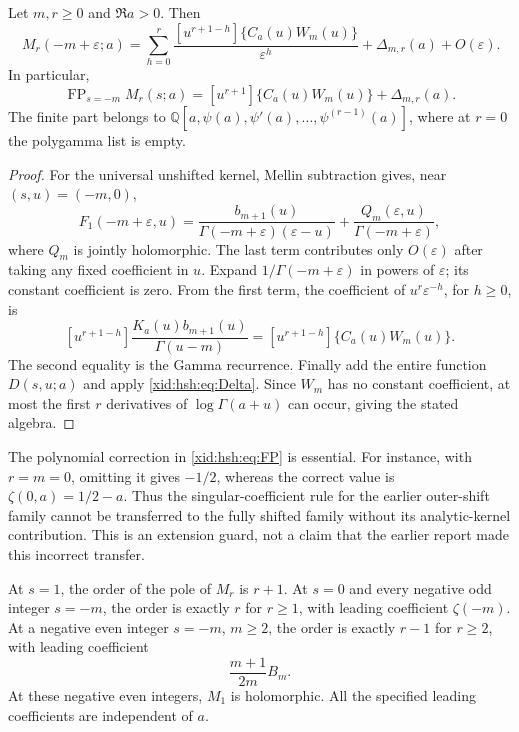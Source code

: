 \begin{theorem}
\label{xid:hsh:thm:Laurent}
Let $m,r\ge0$ and $\Re a>0$. Then
\begin{equation}\label{xid:hsh:eq:Laurent}
 \boxed{\quad
 M_r(-m+\varepsilon;a)=
 \sum_{h=0}^r
     \frac{[u^{r+1-h}]\{C_a(u)W_m(u)\}}{\varepsilon^h}
   +\Delta_{m,r}(a)+O(\varepsilon).
 \quad}
\end{equation}
In particular,
\begin{equation}\label{xid:hsh:eq:FP}
 \operatorname{FP}_{s=-m}M_r(s;a)
  =[u^{r+1}]\{C_a(u)W_m(u)\}+\Delta_{m,r}(a).
\end{equation}
The finite part belongs to
$\mathbb Q[a,\psi(a),\psi'(a),\ldots,\psi^{(r-1)}(a)]$,
where at $r=0$ the polygamma list is empty.
\end{theorem}

\begin{proof}
For the universal unshifted kernel, Mellin subtraction gives, near
$(s,u)=(-m,0)$,
\[
 F_1(-m+\varepsilon,u)
 =\frac{b_{m+1}(u)}{\Gamma(-m+\varepsilon)(\varepsilon-u)}
       +\frac{Q_m(\varepsilon,u)}{\Gamma(-m+\varepsilon)},
\]
where $Q_m$ is jointly holomorphic. The last term contributes only
$O(\varepsilon)$ after taking any fixed coefficient in $u$.
Expand $1/\Gamma(-m+\varepsilon)$ in powers of $\varepsilon$;
its constant coefficient is zero. From the first term, the coefficient
of $u^r\varepsilon^{-h}$, for $h\ge0$, is
\[
 [u^{r+1-h}]\frac{K_a(u)b_{m+1}(u)}{\Gamma(u-m)}
   =[u^{r+1-h}]\{C_a(u)W_m(u)\}.
\]
The second equality is the Gamma recurrence. Finally add the entire
function $D(s,u;a)$ and apply \eqref{xid:hsh:eq:Delta}. Since $W_m$ has
no constant coefficient, at most the first $r$ derivatives of
$\log\Gamma(a+u)$ can occur, giving the stated algebra.
\end{proof}

The polynomial correction in \eqref{xid:hsh:eq:FP} is essential. For instance,
with $r=m=0$, omitting it gives $-1/2$, whereas the correct value is
$\zeta(0,a)=1/2-a$. Thus the singular-coefficient rule for the earlier
outer-shift family cannot be transferred to the fully shifted family
without its analytic-kernel contribution. This is an extension guard,
not a claim that the earlier report made this incorrect transfer.

\begin{corollary}
\label{xid:hsh:cor:poles}
At $s=1$, the order of the pole of $M_r$ is $r+1$.
At $s=0$ and every negative odd integer $s=-m$, the order is exactly $r$
for $r\ge1$, with leading coefficient $\zeta(-m)$.
At a negative even integer $s=-m$, $m\ge2$, the order is exactly $r-1$
for $r\ge2$, with leading coefficient
\begin{equation}\label{xid:hsh:eq:evenleading}
 \frac{m+1}{2m}B_m.
\end{equation}
At these negative even integers, $M_1$ is holomorphic.
All the specified leading coefficients are independent of $a$.
\end{corollary}

